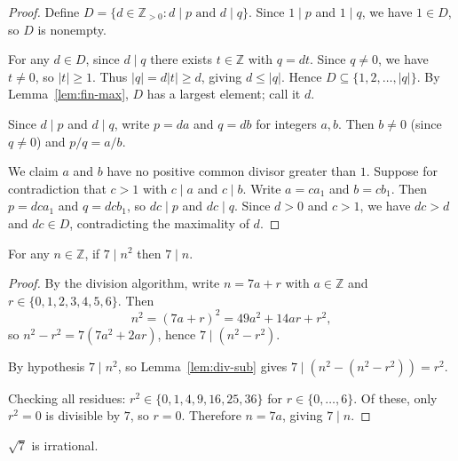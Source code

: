 \begin{proof}
Define $D = \{d \in \mathbb{Z}_{>0} : d \mid p \text{ and } d \mid q\}$. Since $1 \mid p$ and $1 \mid q$, we have $1 \in D$, so $D$ is nonempty.

For any $d \in D$, since $d \mid q$ there exists $t \in \mathbb{Z}$ with $q = dt$. Since $q \neq 0$, we have $t \neq 0$, so $|t| \geq 1$. Thus $|q| = d|t| \geq d$, giving $d \leq |q|$. Hence $D \subseteq \{1, 2, \ldots, |q|\}$. By Lemma~\ref{lem:fin-max}, $D$ has a largest element; call it $d$.

Since $d \mid p$ and $d \mid q$, write $p = da$ and $q = db$ for integers $a, b$. Then $b \neq 0$ (since $q \neq 0$) and $p/q = a/b$.

We claim $a$ and $b$ have no positive common divisor greater than $1$. Suppose for contradiction that $c > 1$ with $c \mid a$ and $c \mid b$. Write $a = ca_1$ and $b = cb_1$. Then $p = dca_1$ and $q = dcb_1$, so $dc \mid p$ and $dc \mid q$. Since $d > 0$ and $c > 1$, we have $dc > d$ and $dc \in D$, contradicting the maximality of $d$.
\end{proof}

\begin{lemma}\label{lem:prime7}
For any $n \in \mathbb{Z}$, if $7 \mid n^2$ then $7 \mid n$.
\end{lemma}

\begin{proof}
By the division algorithm, write $n = 7a + r$ with $a \in \mathbb{Z}$ and $r \in \{0, 1, 2, 3, 4, 5, 6\}$. Then
\[
n^2 = (7a + r)^2 = 49a^2 + 14ar + r^2,
\]
so $n^2 - r^2 = 7(7a^2 + 2ar)$, hence $7 \mid (n^2 - r^2)$.

By hypothesis $7 \mid n^2$, so Lemma~\ref{lem:div-sub} gives $7 \mid (n^2 - (n^2 - r^2)) = r^2$.

Checking all residues: $r^2 \in \{0, 1, 4, 9, 16, 25, 36\}$ for $r \in \{0,\ldots,6\}$. Of these, only $r^2 = 0$ is divisible by $7$, so $r = 0$. Therefore $n = 7a$, giving $7 \mid n$.
\end{proof}

\begin{theorem}\label{thm:sqrt7-irr}
$\sqrt{7}$ is irrational.
\end{theorem}

